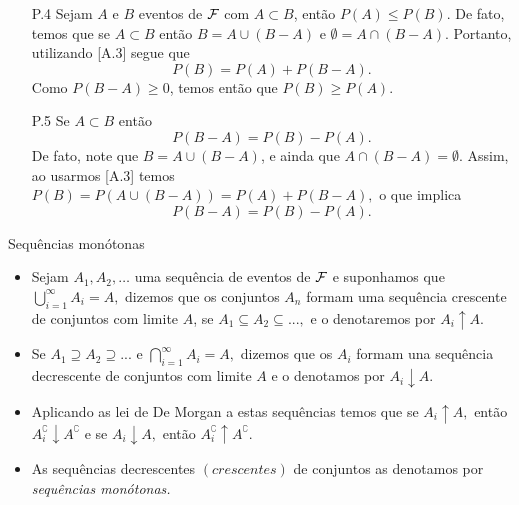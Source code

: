 \begin{frame}
\begin{enumerate}
\item[P.4] Sejam  $A$ e $B$ eventos de ${\cal F}$ com $A  \subset  B$, então $P(A) \leq P(B).$ De fato, temos que se $ A\subset B $ então $ B = A\cup (B - A) $ e  $ \emptyset = A\cap (B - A) .$  Portanto, utilizando [A.3] segue que 
\[P(B)=P(A)+P(B- A).\] 	 
Como $ P(B - A)\geq 0 $, temos então que $ P(B)\geq P(A).$

\item[P.5] Se $ A\subset B$ então  $$P(B- A)=P(B)-P(A).$$ De fato, note que $ B=A\cup (B- A) $, e ainda que $ A\cap (B - A)=\emptyset $. Assim, ao usarmos [A.3] temos $P(B)=P(A\cup (B- A))=P(A)+P(B- A),$ o que implica $$P(B- A)=P(B)-P(A).$$ 	
\end{enumerate}
\begin{block}{Sequências monótonas}
 \begin{itemize}
\item Sejam  $A_1, A_2, \ldots$ uma sequência de eventos de
${\cal F}$ e suponhamos que $\bigcup _{i=1}^{\infty }A_i=A,$ dizemos que os
conjuntos $A_{n}$ formam uma sequência crescente de conjuntos com limite $A$, se
$A_{1}\subseteq A_{2}\subseteq
...,$  e  o denotaremos por $A_{i}\uparrow A.$ 

\item Se $A_{1}\supseteq
A_{2}\supseteq ...$ e $\bigcap _{i=1}^{\infty }A_{i}=A,$ dizemos que os $A_{i}$
formam una sequência decrescente de conjuntos com limite $A$ e o
denotamos por $A_{i}\downarrow A.$ 

\item Aplicando as lei de De Morgan a estas
sequências temos que se $A_{i}\uparrow A,$ então $A_{i}^\complement\downarrow
A^\complement$ e se $A_{i}\downarrow A,$ então $A_{i}^\complement\uparrow A^\complement $. 

\item As sequências
decrescentes $\left( crescentes\right) $ de conjuntos as denotamos por
{\it sequências monótonas.}

 \end{itemize}
 \end{block}
\end{frame}

